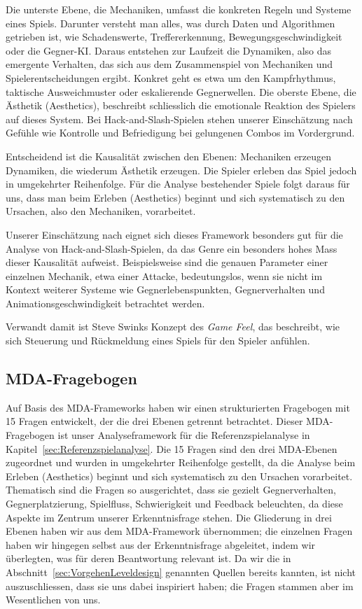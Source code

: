 \documentclass[../Main.tex]{subfiles}
\begin{document}
Die unterste Ebene, die Mechaniken, umfasst die konkreten Regeln und Systeme eines Spiels. Darunter versteht man alles, was durch Daten und Algorithmen getrieben ist, wie Schadenswerte, Treffererkennung, Bewegungsgeschwindigkeit oder die Gegner-KI. Daraus entstehen zur Laufzeit die Dynamiken, also das emergente Verhalten, das sich aus dem Zusammenspiel von Mechaniken und Spielerentscheidungen ergibt. Konkret geht es etwa um den Kampfrhythmus, taktische Ausweichmuster oder eskalierende Gegnerwellen. Die oberste Ebene, die Ästhetik (Aesthetics), beschreibt schliesslich die emotionale Reaktion des Spielers auf dieses System.\autocite[2]{hunicke2004mda} Bei Hack-and-Slash-Spielen stehen unserer Einschätzung nach Gefühle wie Kontrolle und Befriedigung bei gelungenen Combos im Vordergrund.

Entscheidend ist die Kausalität zwischen den Ebenen: Mechaniken erzeugen Dynamiken, die wiederum Ästhetik erzeugen. Die Spieler erleben das Spiel jedoch in umgekehrter Reihenfolge.\autocite[2]{hunicke2004mda} Für die Analyse bestehender Spiele folgt daraus für uns, dass man beim Erleben (Aesthetics) beginnt und sich systematisch zu den Ursachen, also den Mechaniken, vorarbeitet.

Unserer Einschätzung nach eignet sich dieses Framework besonders gut für die Analyse von Hack-and-Slash-Spielen, da das Genre ein besonders hohes Mass dieser Kausalität aufweist. Beispielsweise sind die genauen Parameter einer einzelnen Mechanik, etwa einer Attacke, bedeutungslos, wenn sie nicht im Kontext weiterer Systeme wie Gegnerlebenspunkten, Gegnerverhalten und Animationsgeschwindigkeit betrachtet werden.

Verwandt damit ist Steve Swinks Konzept des \textit{Game Feel}, das beschreibt, wie sich Steuerung und Rückmeldung eines Spiels für den Spieler anfühlen.\autocite[1--6]{swink2008gamefeel}

\subsection{MDA-Fragebogen} \label{sec:Analysefragebogen}

Auf Basis des MDA-Frameworks haben wir einen strukturierten Fragebogen mit 15 Fragen entwickelt, der die drei Ebenen getrennt betrachtet. Dieser MDA-Fragebogen ist unser Analyseframework für die Referenzspielanalyse in Kapitel~\ref{sec:Referenzspielanalyse}. Die 15 Fragen sind den drei MDA-Ebenen zugeordnet und wurden in umgekehrter Reihenfolge gestellt, da die Analyse beim Erleben (Aesthetics) beginnt und sich systematisch zu den Ursachen vorarbeitet. Thematisch sind die Fragen so ausgerichtet, dass sie gezielt Gegnerverhalten, Gegnerplatzierung, Spielfluss, Schwierigkeit und Feedback beleuchten, da diese Aspekte im Zentrum unserer Erkenntnisfrage stehen. Die Gliederung in drei Ebenen haben wir aus dem MDA-Framework übernommen;\autocite{hunicke2004mda} die einzelnen Fragen haben wir hingegen selbst aus der Erkenntnisfrage abgeleitet, indem wir überlegten, was für deren Beantwortung relevant ist. Da wir die in Abschnitt~\ref{sec:VorgehenLeveldesign} genannten Quellen bereits kannten, ist nicht auszuschliessen, dass sie uns dabei inspiriert haben; die Fragen stammen aber im Wesentlichen von uns.
\end{document}
